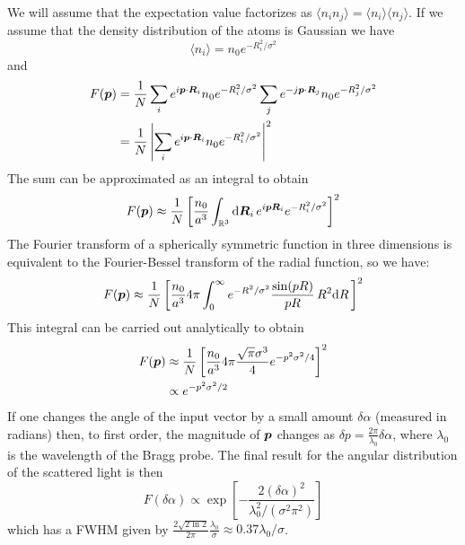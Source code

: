 We will assume that the expectation value factorizes as $\langle n_{i} n_{j}
\rangle = \langle n_{i} \rangle \langle n_{j} \rangle $.   If we assume that
the density distribution of the atoms is Gaussian we have 
\begin{equation}
  \langle n_{i} \rangle =  n_{0} e^{ - R_{i}^{2}/\sigma^{2}}
\end{equation} 
and 
\begin{equation}
\begin{split} 
F(\bm{p})  & = 
   \frac{1}{N}
   \sum_{i} 
      e^{ i \bm{p} \cdot \bm{R}_{i}}  n_{0} e^{ - R_{i}^{2}/\sigma^{2}}
   \sum_{j} 
      e^{ -j \bm{p} \cdot \bm{R}_{j} } n_{0} e^{ - R_{j}^{2}/\sigma^{2}} \\ 
   & =\frac{1}{N}
   \left| \sum_{i} 
      e^{ i \bm{p} \cdot \bm{R}_{i}}  n_{0} e^{ - R_{i}^{2}/\sigma^{2}} \right|^{2}
\end{split}
\end{equation}
The sum can be approximated as an integral to obtain 
\begin{equation}
F(\bm{p})   \approx 
  \frac{1}{N} 
  \left[ 
   \frac{n_{0}}{ a^{3}} 
   \int_{\mathbb{R}^{3}} \mathrm{d}\bm{R}_{i}  \,
      e^{ i \bm{p}\bm{R}_{i}  }  
    e^{ - R_{i}^{2}/\sigma^{2}} \right]^{2}
\end{equation} 
The Fourier transform of a spherically
symmetric function in three dimensions is equivalent to the Fourier-Bessel
transform of the radial function, so we have: 
\begin{equation}
F(\bm{p})   \approx
  \frac{1}{N} \left[ 
   \frac{n_{0}}{ a^{3}} 4 \pi  
   \int_{0}^{\infty} 
    e^{ - R^{2}/\sigma^{2}}
   \frac{ \sin(pR)}{pR}\, R^{2} 
   \mathrm{d}R  \, \right]^{2}
\end{equation}
This integral can be carried out analytically to obtain
\begin{equation}
\begin{split} 
F(\bm{p}) &  \approx \frac{1}{N}
  \left[   \frac{n_{0}}{ a^{3}} 4 \pi 
  \frac{ \sqrt{\pi} \sigma^{3} }{4} e^{-p^{2} \sigma^{2} / 4 }  \right]^{2} \\
& \propto e^{-p^{2} \sigma^{2} / 2 }
\end{split}
\end{equation}
If one changes the angle of the input vector by a small amount $\delta\alpha$
(measured in radians)  then, to first order, the magnitude of $\bm{p}$ changes
as $\delta p = \frac{2\pi}{\lambda_{0}} \delta\alpha$, where $\lambda_{0}$ is
the wavelength of the Bragg probe. The final result for the angular
distribution of the scattered light is then
\begin{equation}
F(\delta\alpha)   \propto
  \exp\left[  - \frac{ 2  (\delta\alpha)^{2} }
       { \lambda_{0}^{2} / (\sigma^{2} \pi^{2}) } \right]   
\end{equation}
which has a FWHM given by $ \frac{2 \sqrt{2\ln2}}{2 \pi}
\frac{\lambda_{0}}{\sigma} \approx 0.37 \lambda_{0} / \sigma $. 

